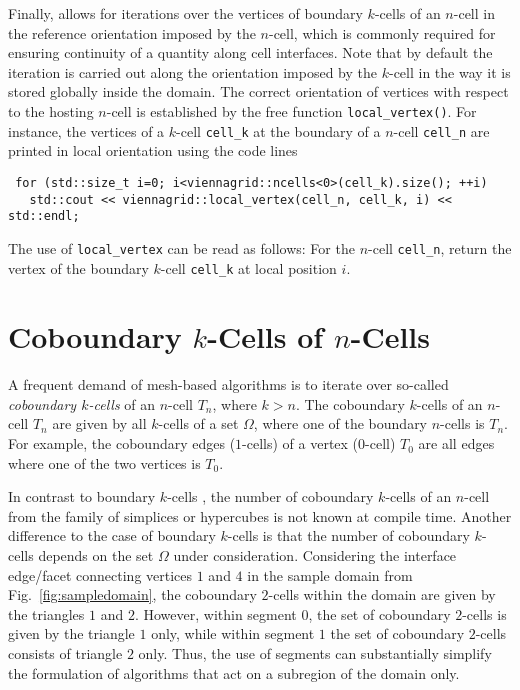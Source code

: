 
Finally, {\ViennaGrid} allows for iterations over the vertices of boundary $k$-cells of an $n$-cell in the reference orientation imposed by the $n$-cell, which is commonly required for ensuring continuity of a quantity along cell interfaces. Note that by default the iteration is carried out along the orientation imposed by the $k$-cell in the way it is stored globally inside the domain.
The correct orientation of vertices with respect to the hosting $n$-cell is established by the free function \lstinline|local_vertex()|. 
For instance, the vertices of a $k$-cell \lstinline|cell_k| at the boundary of a $n$-cell \lstinline|cell_n| are printed in local orientation using the code lines
\begin{lstlisting}
 for (std::size_t i=0; i<viennagrid::ncells<0>(cell_k).size(); ++i)
   std::cout << viennagrid::local_vertex(cell_n, cell_k, i) << std::endl;
\end{lstlisting}
The use of \lstinline|local_vertex| can be read as follows: For the $n$-cell \lstinline|cell_n|, return the vertex of the boundary $k$-cell \lstinline|cell_k| at local position $i$.

\section{Coboundary $k$-Cells of $n$-Cells}
A frequent demand of mesh-based algorithms is to iterate over so-called \emph{coboundary $k$-cells} of an $n$-cell $T_n$, where $k > n$.
The coboundary $k$-cells of an $n$-cell $T_n$ are given by all $k$-cells of a set $\Omega$, where one of the boundary $n$-cells is $T_n$.
For example, the coboundary edges ($1$-cells) of a vertex ($0$-cell) $T_0$ are all edges where one of the two vertices is $T_0$.

In contrast to boundary $k$-cells , the number of coboundary $k$-cells of an $n$-cell from the family of simplices or hypercubes is not known at compile time.
Another difference to the case of boundary $k$-cells is that the number of coboundary $k$-cells depends on the set $\Omega$ under consideration.
Considering the interface edge/facet connecting vertices $1$ and $4$ in the sample domain from Fig.~\ref{fig:sampledomain}, the coboundary $2$-cells within the domain are given by the triangles $1$ and $2$.
However, within segment $0$, the set of coboundary $2$-cells is given by the triangle $1$ only, while within segment $1$ the set of coboundary $2$-cells consists of triangle $2$ only.
Thus, the use of segments can substantially simplify the formulation of algorithms that act on a subregion of the domain only.

